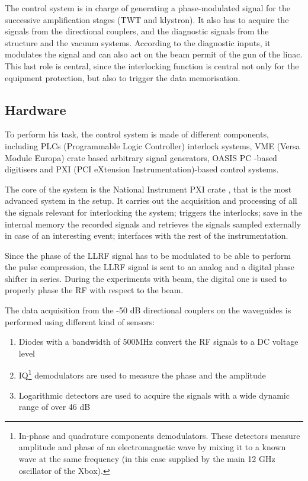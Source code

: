 The control system is in charge of generating a phase-modulated signal for the successive amplification stages (TWT and klystron). It also has to acquire the signals from the directional couplers, and the diagnostic signals from the structure and the vacuum systems. According to the diagnostic inputs, it modulates the signal and can also act on the beam permit of the gun of the linac. This last role is central, since the interlocking function is central not only for the equipment protection, but also to trigger the data memorisation. 


\subsection[Hardware]{Hardware}

To perform his task, the control system is made of different components, including PLCs (Programmable Logic Controller) interlock systems,  VME (Versa Module Europa) crate based arbitrary signal generators, OASIS PC \cite{OASIS}-based digitisers and PXI (PCI eXtension Instrumentation)-based control systems.

The core of the system is the National Instrument PXI crate \cite{NI:PXI}, that is the most advanced system in the setup. It carries out the acquisition and processing of all the signals relevant for interlocking the system; triggers the interlocks; save in the internal memory the recorded signals and retrieves the signals sampled externally in case of an interesting event; interfaces with the rest of the instrumentation.

Since the phase of the LLRF signal has to be modulated to be able to perform the pulse compression, the LLRF signal is sent to an analog and a digital phase shifter in series. During the experiments with beam, the digital one is used to properly phase the RF with respect to the beam.

The data acquisition from the -50 dB directional couplers on the waveguides is performed using different kind of sensors:
\begin{enumerate}
\item Diodes with a bandwidth of 500MHz convert the RF signals to a DC voltage level
\item IQ\footnote{In-phase and quadrature components demodulators. These detectors measure amplitude and phase of an electromagnetic wave by mixing it to a known wave at the same frequency (in this case supplied by the main 12 GHz oscillator of the Xbox).} demodulators are used to measure the phase and the amplitude
\item Logarithmic detectors are used to acquire the signals with a wide dynamic range of over 46 dB
\end{enumerate}

